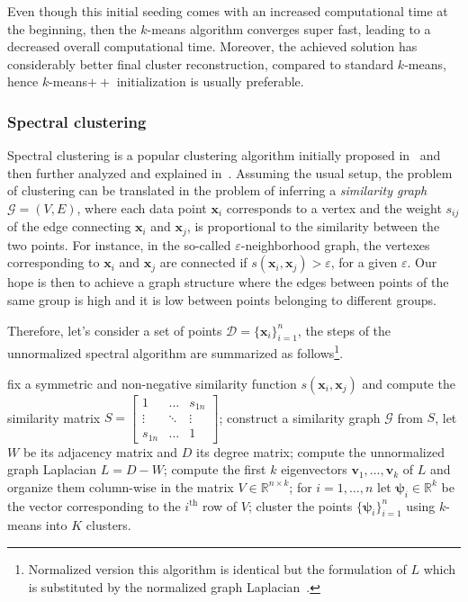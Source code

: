 	Even though this initial seeding comes with an increased computational time at the beginning, then the $k$-means algorithm converges super fast, leading to a decreased overall computational time. Moreover, the achieved solution has considerably better final cluster reconstruction, compared to standard $k$-means, hence $k$-means$++$ initialization is usually preferable.
    
    \subsubsection{Spectral clustering} \label{sec:spectral_clustering}
	Spectral clustering is a popular clustering algorithm initially proposed in~\cite{shi2000normalized} and then further analyzed and explained in~\cite{ng2002spectral, von2007tutorial}.
	Assuming the usual setup, the problem of clustering can be translated in the problem of inferring a \textit{similarity graph} $\mathcal{G} = (V, E)$, where each data point $\bm{x}_i$ corresponds to a vertex and the weight $s_{ij}$ of the edge connecting $\bm{x}_i$ and $\bm{x}_j$, is proportional to the similarity between the two points.
	For instance, in the so-called $\varepsilon$-neighborhood graph, the vertexes corresponding to $\bm{x}_i$ and $\bm{x}_j$ are connected if $s(\bm{x}_i, \bm{x}_j) > \varepsilon$, for a given $\varepsilon$.
	Our hope is then to achieve a graph structure where the edges between points of the same group is high and it is low between points belonging to different groups.

	Therefore, let's consider a set of points $\mathcal{D}=\{\bm{x}_i\}_{i=1}^n$, the steps of the unnormalized spectral algorithm are summarized as follows\footnote{ Normalized version this algorithm is identical but the formulation of $L$ which is substituted by the normalized graph Laplacian~\cite{von2007tutorial}.}.
	\begin{algorithm}[h!]
	\begin{algorithmic}[1]
		\State fix a symmetric and non-negative similarity function $s(\bm{x}_i, \bm{x}_j)$ and compute the similarity matrix $S=
		\begin{bmatrix}
		1       & \dots & s_{1n} \\
		\vdots & \ddots & \vdots \\
		s_{1n}       & \dots & 1
		\end{bmatrix}
		$;
		\State construct a similarity graph $\mathcal{G}$ from $S$, let $W$ be its adjacency matrix and $D$ its degree matrix;
		\State compute the unnormalized graph Laplacian $L = D - W$;
		\State compute the first $k$ eigenvectors $\bm{v}_1, \dots, \bm{v}_k$ of $L$ and organize them column-wise in the matrix $V \in \mathbb{R}^{n \times k}$;
		\State for $i=1,\dots,n$ let $\bm{\psi}_i \in \mathbb{R}^k$ be the vector corresponding to the $i^{\text{th}}$ row of $V$;
		\State cluster the points $\{\bm{\psi}_i\}_{i=1}^n$ using $k$-means into $K$ clusters.
	\end{algorithmic}
	\end{algorithm}
	
